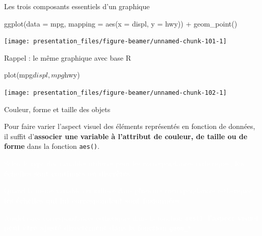 \documentclass[12pt,handout,ignorenonframetext,]{beamer}
\newenvironment{Shaded}{}{}
\newcommand{\KeywordTok}[1]{\textcolor[rgb]{0.00,0.00,1.00}{#1}}
\newcommand{\DataTypeTok}[1]{#1}
\newcommand{\StringTok}[1]{\textcolor[rgb]{0.00,0.50,0.50}{#1}}
\newcommand{\OperatorTok}[1]{#1}
\newcommand{\NormalTok}[1]{#1}
\renewenvironment{Shaded}{\begin{snugshade}}{\end{snugshade}}
\begin{document}
\begin{frame}[fragile]{\large Les trois composants essentiels d'un
graphique}

\center \small 

\begin{Shaded}
\begin{Highlighting}[]
\KeywordTok{ggplot}\NormalTok{(}\DataTypeTok{data =}\NormalTok{ mpg, }\DataTypeTok{mapping =} \KeywordTok{aes}\NormalTok{(}\DataTypeTok{x =}\NormalTok{ displ, }\DataTypeTok{y =}\NormalTok{ hwy)) }\OperatorTok{+}
\StringTok{  }\KeywordTok{geom_point}\NormalTok{()}
\end{Highlighting}
\end{Shaded}

\texttt{[image: presentation\_files/figure-beamer/unnamed-chunk-101-1]}

\end{frame}

\begin{frame}[fragile]{\large Rappel : le même graphique avec base R}

\centering \footnotesize

\begin{Shaded}
\begin{Highlighting}[]
\KeywordTok{plot}\NormalTok{(mpg}\OperatorTok{$}\NormalTok{displ, mpg}\OperatorTok{$}\NormalTok{hwy)}
\end{Highlighting}
\end{Shaded}

\texttt{[image: presentation\_files/figure-beamer/unnamed-chunk-102-1]}

\end{frame}

\begin{frame}{Couleur, forme et taille des objets}

Pour faire varier l'aspect visuel des éléments représentés en fonction
de données, il suffit
d'\textbf{associer une variable à l'attribut de couleur, de taille ou de forme}
dans la fonction \texttt{aes()}.

\textcolor{white}{Selon le type des variables utilisées pour les correspondances esthétiques, \textbf{les échelles sont continues ou discrètes}.}

\textcolor{white}{Quand la même variable est utilisée dans plusieurs correspondances esthétiques, \textbf{les échelles qui lui correspondent sont fusionnées}.}

\textcolor{white}{Au-delà des correspondances esthétiques dans la fonction \texttt{aes()}, \textbf{l'aspect visuel peut être ajusté directement dans la fonction \texttt{geom\_*}}.}

\end{frame}
\end{document}
